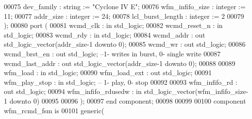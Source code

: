 \begin{DoxyCode}
00075         dev_family              : \textcolor{comment}{string}  := \textcolor{keyword}{"Cyclone IV E"}; 
00076         wfm_infifo_size     : \textcolor{comment}{integer} := \textcolor{vhdllogic}{}\textcolor{vhdllogic}{11};
00077         addr_size               : \textcolor{comment}{integer} := \textcolor{vhdllogic}{}\textcolor{vhdllogic}{24};
00078         lcl_burst_length        : \textcolor{comment}{integer} := \textcolor{vhdllogic}{}\textcolor{vhdllogic}{2}
00079 );
00080     \textcolor{keywordflow}{port} (
00081         wcmd_clk                    : \textcolor{keywordflow}{in} \textcolor{comment}{std\_logic};
00082         wcmd_reset_n            : \textcolor{keywordflow}{in}  \textcolor{comment}{std\_logic};
00083         wcmd_rdy                    : \textcolor{keywordflow}{in} \textcolor{comment}{std\_logic};
00084         wcmd_addr               : \textcolor{keywordflow}{out} \textcolor{comment}{std\_logic\_vector}(addr_size\textcolor{vhdlchar}{-}\textcolor{vhdllogic}{}\textcolor{vhdllogic}{1} \textcolor{keywordflow}{downto} \textcolor{vhdllogic}{}\textcolor{vhdllogic}{0});
00085         wcmd_wr                 : \textcolor{keywordflow}{out} \textcolor{comment}{std\_logic};
00086         wcmd_brst_en            : \textcolor{keywordflow}{out} \textcolor{comment}{std\_logic}; \textcolor{keyword}{--1- writes in burst, 0- single write}
00087         wcmd_last_addr          : \textcolor{keywordflow}{out} \textcolor{comment}{std\_logic\_vector}(addr_size\textcolor{vhdlchar}{-}\textcolor{vhdllogic}{}\textcolor{vhdllogic}{1} \textcolor{keywordflow}{downto} \textcolor{vhdllogic}{}\textcolor{vhdllogic}{0});
00088 
00089         wfm_load                    : \textcolor{keywordflow}{in} \textcolor{comment}{std\_logic};
00090         wfm_load_ext            : \textcolor{keywordflow}{out} \textcolor{comment}{std\_logic};
00091         wfm_play_stop           : \textcolor{keywordflow}{in} \textcolor{comment}{std\_logic}; \textcolor{keyword}{-- 1- play, 0- stop}
00092 
00093         wfm_infifo_rd           : \textcolor{keywordflow}{out} \textcolor{comment}{std\_logic};
00094         wfm_infifo_rdusedw  : \textcolor{keywordflow}{in} \textcolor{comment}{std\_logic\_vector}(wfm_infifo_size\textcolor{vhdlchar}{-}\textcolor{vhdllogic}{}\textcolor{vhdllogic}{1} \textcolor{keywordflow}{downto} \textcolor{vhdllogic}{}\textcolor{vhdllogic}{0})
00095         
00096         );
00097 \textcolor{keywordflow}{end} \textcolor{keywordflow}{component};
00098 
00099 
00100 \textcolor{keywordflow}{component} wfm_rcmd_fsm \textcolor{keywordflow}{is}
00101     \textcolor{keywordflow}{generic}(

\end{DoxyCode}
